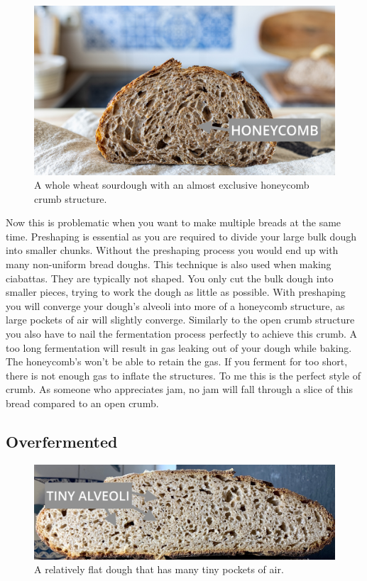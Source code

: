 \begin{figure}
  \includegraphics[width=\textwidth]{honeycomb}
  \caption{A whole wheat sourdough with an almost exclusive honeycomb crumb structure.}
  \label{fig:honeycomb}
\end{figure}


Now this is problematic when you want to
make multiple breads at the same time. Preshaping is essential as you are required
to divide your large bulk dough into smaller chunks. Without the preshaping
process you would end up with many non-uniform bread doughs. This technique is
also used when making ciabattas. They are typically not shaped. You only cut the
bulk dough into smaller pieces, trying to work the dough as little as possible.
With preshaping you will converge your dough's alveoli into more of a honeycomb structure,
as large pockets of air will slightly converge. Similarly to the open crumb structure
you also have to nail the fermentation process perfectly to achieve this crumb.
A too long fermentation will result in gas leaking out of your dough while baking.
The honeycomb's won't be able to retain the gas. If you ferment for too short,
there is not enough gas to inflate the structures. To me this is the perfect
style of crumb. As someone who appreciates jam, no jam will fall through a slice
of this bread compared to an open crumb.

\subsection{Overfermented}

\begin{figure}
  \includegraphics[width=\textwidth]{fermented-too-long}
  \caption{A relatively flat dough that has many tiny pockets of air.}
  \label{fig:fermented-too-long}
\end{figure}

